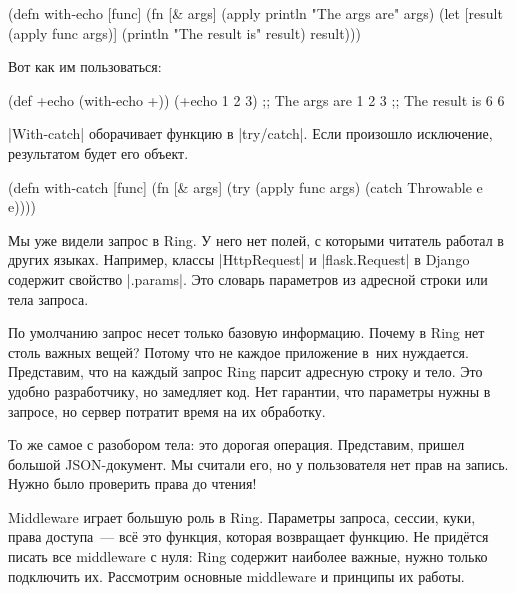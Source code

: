 \begin{english}
  \begin{clojure}
(defn with-echo [func]
  (fn [& args]
    (apply println "The args are" args)
    (let [result (apply func args)]
      (println "The result is" result)
      result)))
  \end{clojure}
\end{english}

Вот как им пользоваться:

\begin{english}
  \begin{clojure}
(def +echo (with-echo +))
(+echo 1 2 3)
;; The args are 1 2 3
;; The result is 6
6
  \end{clojure}
\end{english}


\spverb|With-catch| оборачивает функцию в \spverb|try/catch|. Если произошло
исключение, результатом будет его объект.

\begin{english}
  \begin{clojure}
(defn with-catch [func]
  (fn [& args]
    (try
      (apply func args)
      (catch Throwable e
        e))))
  \end{clojure}
\end{english}

Мы уже видели запрос в Ring. У него нет полей, с которыми читатель работал в
других языках. Например, классы \spverb|HttpRequest| и \spverb|flask.Request| в
Django содержит свойство \spverb|.params|. Это словарь параметров из адресной
строки или тела запроса.

По умолчанию запрос несет только базовую информацию. Почему в Ring нет столь
важных вещей? Потому что не каждое приложение в~них нуждается. Представим, что
на каждый запрос Ring парсит адресную строку и тело. Это удобно разработчику, но
замедляет код. Нет гарантии, что параметры нужны в запросе, но сервер потратит
время на их обработку.

То же самое с разобором тела: это дорогая операция. Представим, пришел большой
JSON-документ. Мы считали его, но у пользователя нет прав на запись. Нужно было
проверить права до чтения!

Middleware играет большую роль в Ring. Параметры запроса, сессии, куки, права
доступа~--- вс\"{е} это функция, которая возвращает функцию. Не прид\"{е}тся писать
все middleware с нуля: Ring содержит наиболее важные, нужно только подключить
их. Рассмотрим основные middleware и принципы их работы.

